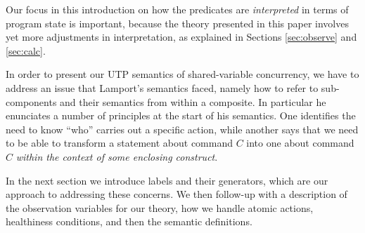 Our focus in this introduction on how the predicates are \emph{interpreted}
in terms of program state is important,
because the theory presented in this paper involves yet more
adjustments in interpretation,
as explained in Sections \ref{sec:observe} and \ref{sec:calc}.


In order to present our UTP semantics of shared-variable
concurrency,
we have to address an issue
that Lamport's semantics\cite{Lamport1985} faced,
namely how to refer to sub-components and their semantics from
within a composite.
In particular he enunciates a number of principles at the start
of his semantics.
One identifies the need to know ``who'' carries out a specific
action, while another says that we need to be able to transform
a statement about command $C$ into one about command $C$ \emph{within
the context of some enclosing construct}.

In the next section we introduce labels and their generators,
which are our approach to addressing these concerns.
We then follow-up with a description of the observation variables
for our theory,
how we handle atomic actions, healthiness conditions,
and then the semantic definitions.
